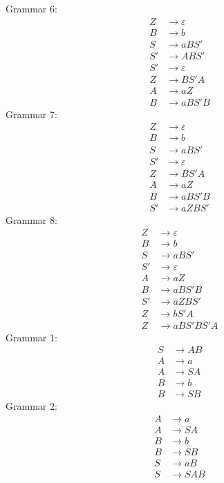 \documentclass[11pt]{article}
\begin{document}
Grammar 6:
\setcounter{equation}{0}
\begin{align}
Z &\rightarrow ε\\
B &\rightarrow b\\
S &\rightarrow a B S'\\
S' &\rightarrow A B S'\\
S' &\rightarrow ε\\
Z &\rightarrow B S' A\\
A &\rightarrow a Z\\
B &\rightarrow a B S' B
\end{align}
Grammar 7:
\setcounter{equation}{0}
\begin{align}
Z &\rightarrow ε\\
B &\rightarrow b\\
S &\rightarrow a B S'\\
S' &\rightarrow ε\\
Z &\rightarrow B S' A\\
A &\rightarrow a Z\\
B &\rightarrow a B S' B\\
S' &\rightarrow a Z B S'
\end{align}
Grammar 8:
\setcounter{equation}{0}
\begin{align}
Z &\rightarrow ε\\
B &\rightarrow b\\
S &\rightarrow a B S'\\
S' &\rightarrow ε\\
A &\rightarrow a Z\\
B &\rightarrow a B S' B\\
S' &\rightarrow a Z B S'\\
Z &\rightarrow b S' A\\
Z &\rightarrow a B S' B S' A
\end{align}
Grammar 1:
\setcounter{equation}{0}
\begin{align}
S &\rightarrow A B\\
A &\rightarrow a\\
A &\rightarrow S A\\
B &\rightarrow b\\
B &\rightarrow S B
\end{align}
Grammar 2:
\setcounter{equation}{0}
\begin{align}
A &\rightarrow a\\
A &\rightarrow S A\\
B &\rightarrow b\\
B &\rightarrow S B\\
S &\rightarrow a B\\
S &\rightarrow S A B
\end{align}
\end{document}
